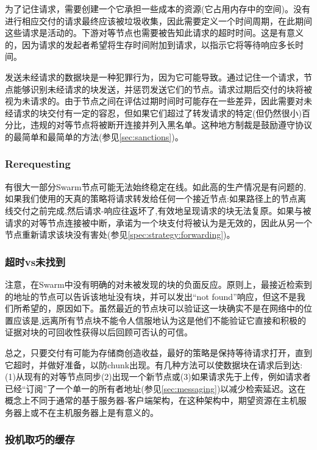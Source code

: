 为了记住请求，需要创建一个它承担一些成本的资源(它占用内存中的空间)。没有进行相应交付的请求最终应该被垃圾收集，因此需要定义一个时间周期，在此期间这些请求是活动的。下游对等节点也需要被告知此请求的超时时间。这是有意义的，因为请求的发起者希望将生存时间附加到请求，以指示它将等待响应多长时间。

发送未经请求的数据块是一种犯罪行为，因为它可能导致。通过记住一个请求，节点能够识别未经请求的块发送，并惩罚发送它们的节点。请求过期后交付的块将被视为未请求的。由于节点之间在评估过期时间时可能存在一些差异，因此需要对未经请求的块交付有一定的容忍，但如果它们超过了转发请求的特定(但仍然很小)百分比，违规的对等节点将被断开连接并列入黑名单。这种地方制裁是鼓励遵守协议的最简单和最简单的方法(参见\ref{sec:sanctions})。 

\subsubsection{Rerequesting}

有很大一部分Swarm节点可能无法始终稳定在线。如此高的生产情况是有问题的,如果我们使用的天真的策略将请求转发给任何一个接近节点:如果路径上的节点离线交付之前完成,然后请求-响应往返坏了,有效地呈现请求的块无法复原。如果与被请求的对等节点连接被中断，承诺为一个块支付将被认为是无效的，因此从另一个节点重新请求该块没有害处(参见\ref{spec:strategy:forwarding})。


\subsubsection{超时vs未找到}

注意，在Swarm中没有明确的对未被发现的块的负面反应。原则上，最接近检索到的地址的节点可以告诉该地址没有块，并可以发出“not found”响应，但这不是我们所希望的，原因如下。虽然最近的节点块可以验证这一块确实不是在网络中的位置应该是,远离所有节点块不能令人信服地认为这是他们不能验证它直接和积极的证据对块的可回收性获得以后回顾可否认的可信。

总之，只要交付有可能为存储商创造收益，最好的策略是保持等待请求打开，直到它超时，并做好准备，以防chunk出现。有几种方法可以使数据块在请求后到达:(1)从现有的对等节点同步(2)出现一个新节点或(3)如果请求先于上传，例如请求者已经“订阅”了一个单一的所有者地址(参见\ref{sec:messaging})以减少检索延迟。这在概念上不同于通常的基于服务器-客户端架构，在这种架构中，期望资源在主机服务器上或不在主机服务器上是有意义的。 
 

\subsubsection{投机取巧的缓存}

